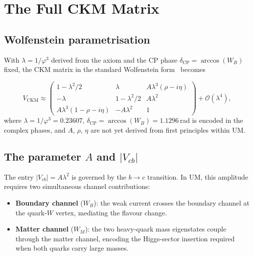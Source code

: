 \documentclass[12pt]{article}
\begin{document}
\section{The Full CKM Matrix}

\subsection{Wolfenstein parametrisation}

With $\lambda = 1/\varphi^3$ derived from the axiom and the
CP phase $\delta_{\text{CP}} = \arccos(W_B)$ fixed, the CKM matrix in
the standard Wolfenstein form~\cite{Wolfenstein1983} becomes

\begin{equation}
  V_{\text{CKM}}
  \approx
  \begin{pmatrix}
    1 - \lambda^2/2 & \lambda & A\lambda^3(\rho - i\eta) \\
    -\lambda & 1 - \lambda^2/2 & A\lambda^2 \\
    A\lambda^3(1-\rho-i\eta) & -A\lambda^2 & 1
  \end{pmatrix}
  + \mathcal{O}(\lambda^4),
  \label{eq:ckm}
\end{equation}
where $\lambda = 1/\varphi^3 = 0.23607$, $\delta_{\text{CP}} =
\arccos(W_B) = 1.1296$\,rad is encoded in the complex phases, and $A$,
$\rho$, $\eta$ are not yet derived from first principles within UM.

\subsection{The parameter $A$ and $|V_{cb}|$}

The entry $|V_{cb}| = A\lambda^2$ is governed by the $b \to c$
transition. In UM, this amplitude requires two simultaneous channel
contributions:

\begin{itemize}
  \item \textbf{Boundary channel} ($W_B$): the weak current crosses the
        boundary channel at the quark-$W$ vertex, mediating the flavour
        change.
  \item \textbf{Matter channel} ($W_M$): the two heavy-quark mass
        eigenstates couple through the matter channel, encoding the
        Higgs-sector insertion required when both quarks carry large
        masses.
\end{itemize}
\end{document}
